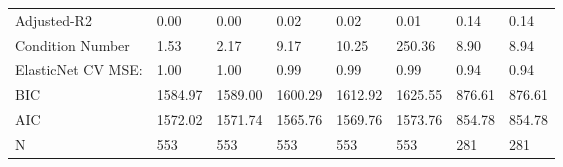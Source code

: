 \begin{table}
\begin{center}
\begin{tabular}{llllllll}
Adjusted-R2                                    & 0.00    & 0.00    & 0.02    & 0.02    & 0.01     & 0.14      & 0.14     \\
Condition Number                               & 1.53    & 2.17    & 9.17    & 10.25   & 250.36   & 8.90      & 8.94     \\
ElasticNet CV MSE:                             & 1.00    & 1.00    & 0.99    & 0.99    & 0.99     & 0.94      & 0.94     \\
BIC                                            & 1584.97 & 1589.00 & 1600.29 & 1612.92 & 1625.55  & 876.61    & 876.61   \\
AIC                                            & 1572.02 & 1571.74 & 1565.76 & 1569.76 & 1573.76  & 854.78    & 854.78   \\
N                                              & 553     & 553     & 553     & 553     & 553      & 281       & 281      \\
\hline
\end{tabular}
\end{center}
\end{table}